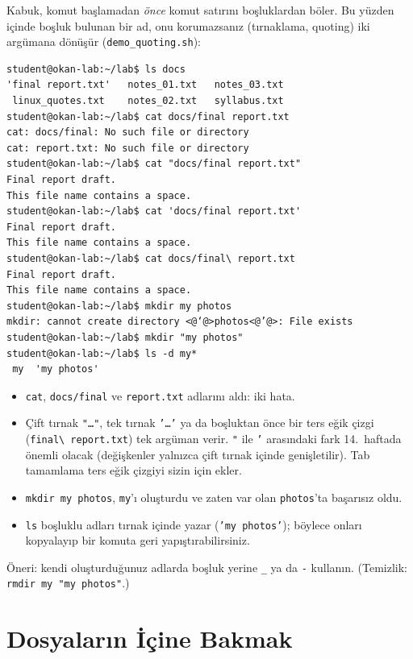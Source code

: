 \documentclass[11pt,a4paper]{article}
\newcommand{\cmd}[1]{\texttt{#1}}
\begin{document}
Kabuk, komut başlamadan \emph{önce} komut satırını boşluklardan böler. Bu yüzden içinde boşluk bulunan bir ad, onu korumazsanız (tırnaklama, quoting) iki argümana dönüşür (\cmd{demo\_quoting.sh}):

\begin{lstlisting}[style=term]
student@okan-lab:~/lab$ ls docs
'final report.txt'   notes_01.txt   notes_03.txt
 linux_quotes.txt    notes_02.txt   syllabus.txt
student@okan-lab:~/lab$ cat docs/final report.txt
cat: docs/final: No such file or directory
cat: report.txt: No such file or directory
student@okan-lab:~/lab$ cat "docs/final report.txt"
Final report draft.
This file name contains a space.
student@okan-lab:~/lab$ cat 'docs/final report.txt'
Final report draft.
This file name contains a space.
student@okan-lab:~/lab$ cat docs/final\ report.txt
Final report draft.
This file name contains a space.
student@okan-lab:~/lab$ mkdir my photos
mkdir: cannot create directory <@‘@>photos<@’@>: File exists
student@okan-lab:~/lab$ mkdir "my photos"
student@okan-lab:~/lab$ ls -d my*
 my  'my photos'
\end{lstlisting}

\begin{itemize}
  \item \cmd{cat}, \texttt{docs/final} ve \texttt{report.txt} adlarını aldı: iki hata.
  \item Çift tırnak \texttt{"\dots"}, tek tırnak \texttt{'\dots'} ya da boşluktan önce bir ters eğik çizgi (\texttt{final\textbackslash\ report.txt}) tek argüman verir. \texttt{"} ile \texttt{'} arasındaki fark 14.~haftada önemli olacak (değişkenler yalnızca çift tırnak içinde genişletilir). Tab tamamlama ters eğik çizgiyi sizin için ekler.
  \item \cmd{mkdir my photos}, \texttt{my}'ı oluşturdu ve zaten var olan \texttt{photos}'ta başarısız oldu.
  \item \cmd{ls} boşluklu adları tırnak içinde yazar (\texttt{'my photos'}); böylece onları kopyalayıp bir komuta geri yapıştırabilirsiniz.
\end{itemize}
Öneri: kendi oluşturduğunuz adlarda boşluk yerine \texttt{\_} ya da \texttt{-} kullanın. (Temizlik: \cmd{rmdir my "my photos"}.)

\section{Dosyaların İçine Bakmak}
\end{document}
